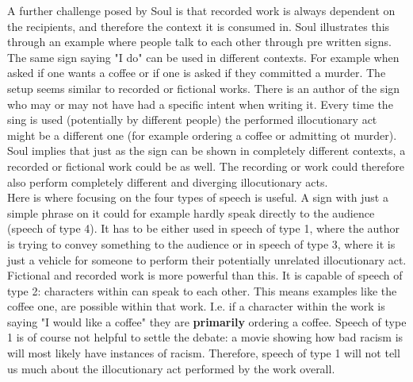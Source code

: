 \documentclass[14pt]{article}
\begin{document}
A further challenge posed by Soul is that recorded work is always dependent on the recipients, and therefore the context it is consumed in.
Soul illustrates this through
an example where people talk to each other through pre written signs. The same sign saying "I do" can be used in different contexts. For example when asked
if one wants a coffee or if one is asked if they committed a murder. The setup seems similar to recorded or fictional works. There is an author of the sign
who may or may not have had a specific intent when writing it. Every time the sing is used (potentially by different people) the performed illocutionary act
might be a different one (for example ordering a coffee or admitting ot murder). Soul implies that just as the sign can be shown in completely different contexts,
a recorded or fictional work could be as well. The recording or work could therefore also perform completely different and diverging illocutionary acts.\\

Here is where focusing on the four types of speech is useful. A sign with just a simple phrase on it
could for example hardly speak directly to the audience (speech of type 4). 
It has to be either used in speech of type 1, 
where the author is trying to convey something to the audience
or in speech of type 3, where it is just a vehicle for someone to perform their potentially unrelated illocutionary act. \\

Fictional and recorded work is more powerful than this. It is capable of speech of type 2: characters within can speak to each other. This means examples 
like the coffee one, are possible within that work. I.e. if a character within the work is saying "I would like a coffee" they are \textbf{primarily} ordering a coffee.
Speech of type 1 is of course not helpful to settle the debate: a movie showing how bad racism is will most likely have instances of racism. Therefore, speech
of type 1 will not tell us much about the illocutionary act performed by the work overall.\\
\end{document}

